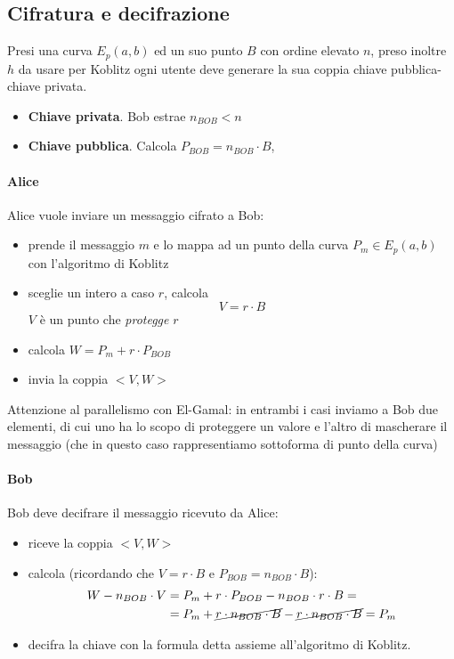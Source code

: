 \subsection{Cifratura e decifrazione}
Presi una curva $E_p(a,b)$ ed un suo punto $B$ con ordine elevato $n$, preso inoltre $h$ da usare per Koblitz ogni utente deve generare la sua coppia chiave pubblica-chiave privata.
\begin{itemize}
    \item \textbf{Chiave privata}. Bob estrae $n_{BOB} < n$
    \item \textbf{Chiave pubblica}. Calcola $P_{BOB} = n_{BOB} \cdot B$,
\end{itemize}

\paragraph{Alice} Alice vuole inviare un messaggio cifrato a Bob:
\begin{itemize}
    \item prende il messaggio $m$ e lo mappa ad un punto della curva $P_m \in E_p(a,b)$ con l'algoritmo di Koblitz
    \item sceglie un intero a caso $r$, calcola $$V = r \cdot B$$
    $V$ è un punto che \emph{protegge} $r$
    \item calcola $W = P_m + r \cdot P_{BOB}$
    \item invia la coppia $<V,W>$
\end{itemize}
Attenzione al parallelismo con El-Gamal: in entrambi i casi inviamo a Bob due elementi, di cui uno ha lo scopo di proteggere un valore e l'altro di mascherare il messaggio (che in questo caso rappresentiamo sottoforma di punto della curva)
\paragraph{Bob} Bob deve decifrare il messaggio ricevuto da Alice:
\begin{itemize}
    \item riceve la coppia $<V,W>$
    \item calcola (ricordando che $V=r\cdot B$ e $P_{BOB}=n_{BOB}\cdot B$):
        \begin{align*}
        	W -n_{BOB} \cdot V &= P_m + r \cdot P_{BOB} - n_{BOB} \cdot r \cdot B =\\
        	&= P_m + \cancel{r \cdot n_{BOB} \cdot B} - \cancel{r \cdot n_{BOB} \cdot B} = P_m
        \end{align*}  
    \item decifra la chiave con la formula detta assieme all'algoritmo di Koblitz.
\end{itemize}

